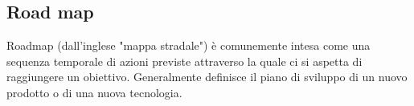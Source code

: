 \subsection*{Road map}
Roadmap (dall'inglese "mappa stradale") è comunemente intesa come una sequenza temporale di azioni previste attraverso la quale ci si aspetta di raggiungere un obiettivo. Generalmente definisce il piano di sviluppo di un nuovo prodotto o di una nuova tecnologia.

